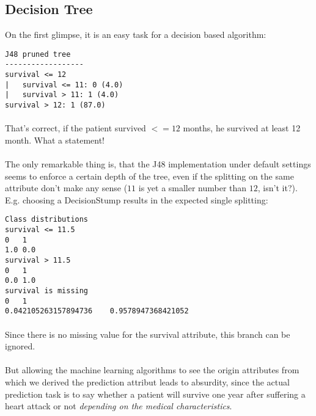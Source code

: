 \documentclass[paper=a4, fontsize=11pt]{scrartcl} %
\numberwithin{equation}{section} %
\numberwithin{figure}{section} %
\numberwithin{table}{section} %
\begin{document}


\subsection{Decision Tree}
On the first glimpse, it is an easy task for a decision based algorithm:

\begin{lstlisting}
J48 pruned tree
------------------
survival <= 12
|   survival <= 11: 0 (4.0)
|   survival > 11: 1 (4.0)
survival > 12: 1 (87.0)
\end{lstlisting}

\paragraph{}That's correct, if the patient survived $ <= 12 $ months, he survived at least 12 month. What a statement! 

\paragraph{}The only remarkable thing is, that the J48 implementation under default settings seems to enforce a certain depth of the tree, even if the splitting on the same attribute don't make any sense ($ 11 $ is yet a smaller number than $ 12 $, isn't it?). E.g. choosing a DecisionStump results in the expected single splitting: 
\begin{lstlisting}
Class distributions
survival <= 11.5
0   1   
1.0 0.0 
survival > 11.5
0   1   
0.0 1.0 
survival is missing
0   1   
0.042105263157894736    0.9578947368421052
\end{lstlisting}
\paragraph{}Since there is no missing value for the survival attribute, this branch can be ignored.

\paragraph{}But allowing the machine learning algorithms to see the origin attributes from which we derived the prediction attribut leads to absurdity, since the actual prediction task is to say whether a patient will survive one year after suffering a heart attack or not \emph{depending on the medical characteristics}.
\end{document}
